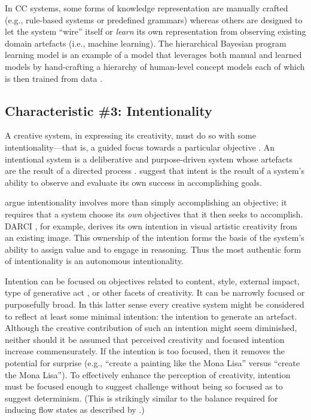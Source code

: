 \documentclass[phd,electronic,oneside,twosidetoc,letterpaper,chaptercenter,parttop,lof,lot]{byumsphd}
\begin{document}
In CC systems, some forms of knowledge representation are manually crafted (e.g., rule-based systems or predefined grammars) whereas others are designed to let the system ``wire'' itself or \textit{learn} its own representation from observing existing domain artefacts (i.e., machine learning). The hierarchical Bayesian program learning model is an example of a model that leverages both manual and learned models by hand-crafting a hierarchy of human-level concept models each of which is then trained from data \citep{Lake2015,Bodily2017ComputationalLearning}.

\subsection{Characteristic \#3: Intentionality}

A creative system, in expressing its creativity, must do so with some intentionality---that is, a guided focus towards a particular objective \citep{Ventura2016,Ackerman2017TeachingCreativity}. An intentional system is a deliberative and purpose-driven system whose artefacts are the result of a directed process \citep{Ventura2016}. \citeauthor{Ackerman2017TeachingCreativity} \cite{Ackerman2017TeachingCreativity} suggest that intent is the result of a system's ability to observe and evaluate its own success in accomplishing goals. 

\citeauthor{guckelsberger2017addressing} \cite{guckelsberger2017addressing} argue intentionality involves more than simply accomplishing an objective; it requires that a system choose its \textit{own} objectives that it then seeks to accomplish. DARCI \citep{norton2013finding}, for example, derives its own intention in visual artistic creativity from an existing image. This ownership of the intention forms the basis of the system's ability to assign value and to engage in reasoning. Thus the most authentic form of intentionality is an autonomous intentionality.

Intention can be focused on objectives related to content, style, external impact, type of generative act \citep{Colton2011}, or other facets of creativity. It can be narrowly focused or purposefully broad. In this latter sense every creative system might be considered to reflect at least some minimal intention: the intention to generate an artefact. Although the creative contribution of such an intention might seem diminished, neither should it be assumed that perceived creativity and focused intention increase commensurately. If the intention is too focused, then it removes the potential for surprise (e.g., ``create a painting like the Mona Lisa'' versus ``create the Mona Lisa''). To effectively enhance the perception of creativity, intention must be focused enough to suggest challenge without being so focused as to suggest determinism. (This is strikingly similar to the balance required for inducing flow states as described by \citep{csikszentmihalyi1997flow}.)
\end{document}
